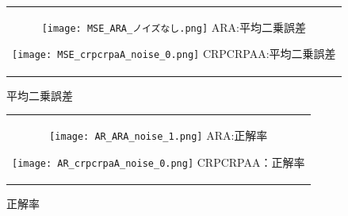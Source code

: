 \documentclass[12pt]{jsarticle}
\begin{document}
\clearpage
\begin{figure}[h]
  \begin{center}
    \begin{tabular}{c}

      \begin{minipage}{0.5\hsize}
        \begin{center}
          \texttt{[image: MSE\_ARA\_ノイズなし.png]}
          \hspace{0.2cm} ARA:平均二乗誤差
        \end{center}
      \end{minipage}

      \begin{minipage}{0.5\hsize}
        \begin{center}
          \texttt{[image: MSE\_crpcrpaA\_noise\_0.png]}
          \hspace{0.2cm} CRPCRPAA:平均二乗誤差
        \end{center}
      \end{minipage}

    \end{tabular}
    \caption{平均二乗誤差}

  \end{center}
\end{figure}


\begin{figure}[h]
  \begin{center}
    \begin{tabular}{c}

      \begin{minipage}{0.5\hsize}
        \begin{center}
          \texttt{[image: AR\_ARA\_noise\_1.png]}
          \hspace{0.2cm} ARA:正解率
        \end{center}
      \end{minipage}
      \begin{minipage}{0.5\hsize}
        \begin{center}
          \texttt{[image: AR\_crpcrpaA\_noise\_0.png]}
          \hspace{0.2cm} CRPCRPAA：正解率
        \end{center}
      \end{minipage}

    \end{tabular}
    \caption{正解率}

  \end{center}
\end{figure}
\end{document}
